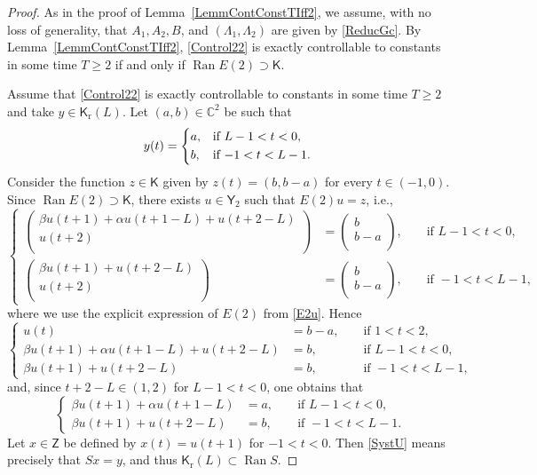 \documentclass[10pt]{article}
\newcommand{\ie}{i.e.,\xspace}
\theoremstyle{plain}
\theoremstyle{definition}
\DeclareMathOperator{\range}{Ran}
\numberwithin{equation}{section}\numberwithin{figure}{section}\emergencystretch=3em
\begin{document}
\begin{proof}
As in the proof of Lemma~\ref{LemmContConstTIff2}, we assume, with no loss of generality, that $A_1, A_2, B$, and $(\Lambda_1, \Lambda_2)$ are given by \eqref{ReducGc}. By Lemma~\ref{LemmContConstTIff2}, \eqref{Control22} is exactly controllable to constants in some time $T \geq 2$ if and only if $\range E(2) \supset \mathsf K$.

Assume that \eqref{Control22} is exactly controllable to constants in some time $T \geq 2$ and take $y \in \mathsf K_{\mathrm r}(L)$. Let $(a, b) \in \mathbb C^2$ be such that
\[
y(t) = \begin{dcases*}
a, & if $L - 1 < t < 0$, \\
b, & if $-1 < t < L - 1$.
\end{dcases*}
\]
Consider the function $z \in \mathsf K$ given by $z(t) = (b, b - a)$ for every $t \in (-1, 0)$. Since $\range E(2) \supset \mathsf K$, there exists $u \in \mathsf Y_2$ such that $E(2) u = z$, \ie 
\[
\left\{
\begin{aligned}
\begin{pmatrix}
\beta u(t + 1) + \alpha u(t + 1 - L) + u(t + 2 - L) \\
u(t + 2) \\
\end{pmatrix} & = \begin{pmatrix}
b \\
b - a \\
\end{pmatrix}, & & \text{ if } L - 1 < t < 0, \\
\begin{pmatrix}
\beta u(t + 1) + u(t + 2 - L) \\
u(t + 2) \\
\end{pmatrix} & = \begin{pmatrix}
b \\
b - a \\
\end{pmatrix}, & & \text{ if } -1 < t < L - 1,
\end{aligned}
\right.
\]
where we use the explicit expression of $E(2)$ from \eqref{E2u}. Hence
\[
\left\{
\begin{aligned}
u(t) & = b - a, & & \text{ if } 1 < t < 2, \\
\beta u(t + 1) + \alpha u(t + 1 - L) + u(t + 2 - L) & = b, & & \text{ if } L - 1 < t < 0, \\
\beta u(t + 1) + u(t + 2 - L) & = b, & & \text{ if } -1 < t < L - 1,
\end{aligned}
\right.
\]
and, since $t + 2 - L \in (1, 2)$ for $L - 1 < t < 0$, one obtains that
\begin{equation}
\label{SystU}
\left\{
\begin{aligned}
\beta u(t + 1) + \alpha u(t + 1 - L) & = a, & & \text{ if } L - 1 < t < 0, \\
\beta u(t + 1) + u(t + 2 - L) & = b, & & \text{ if } -1 < t < L - 1.
\end{aligned}
\right.
\end{equation}
Let $x \in \mathsf Z$ be defined by $x(t) = u(t + 1)$ for $-1 < t < 0$. Then \eqref{SystU} means precisely that $S x = y$, and thus $\mathsf K_{\mathrm r}(L) \subset \range S$.


\end{proof}
\end{document}
